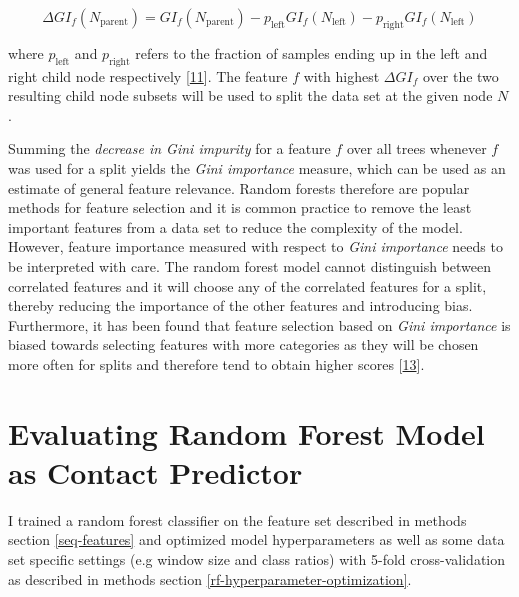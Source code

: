\documentclass[12pt,a4paper,twoside]{book}
\theoremstyle{definition}
\theoremstyle{definition}
\theoremstyle{remark}
\begin{document}
\[
\Delta GI_f(N_{\textrm{parent}}) = GI_f(N_{\textrm{parent}}) - p_{\textrm{left}} GI_f(N_{\textrm{left}}) - p_{\textrm{right}} GI_f(N_{\textrm{left}})
\]

where \(p_{\textrm{left}}\) and \(p_{\textrm{right}}\) refers to the
fraction of samples ending up in the left and right child node
respectively {[}\protect\hyperlink{ref-Menze2009}{11}{]}. The feature
\(f\) with highest \(\Delta GI_f\) over the two resulting child node
subsets will be used to split the data set at the given node \(N\).

Summing the \emph{decrease in Gini impurity} for a feature \(f\) over
all trees whenever \(f\) was used for a split yields the \emph{Gini
importance} measure, which can be used as an estimate of general feature
relevance. Random forests therefore are popular methods for feature
selection and it is common practice to remove the least important
features from a data set to reduce the complexity of the model. However,
feature importance measured with respect to \emph{Gini importance} needs
to be interpreted with care. The random forest model cannot distinguish
between correlated features and it will choose any of the correlated
features for a split, thereby reducing the importance of the other
features and introducing bias. Furthermore, it has been found that
feature selection based on \emph{Gini importance} is biased towards
selecting features with more categories as they will be chosen more
often for splits and therefore tend to obtain higher scores
{[}\protect\hyperlink{ref-Strobl2007}{13}{]}.

\section{Evaluating Random Forest Model as Contact
Predictor}\label{evaluating-random-forest-model-as-contact-predictor}

I trained a random forest classifier on the feature set described in
methods section \ref{seq-features} and optimized model hyperparameters
as well as some data set specific settings (e.g window size and class
ratios) with 5-fold cross-validation as described in methods section
\ref{rf-hyperparameter-optimization}.
\end{document}
